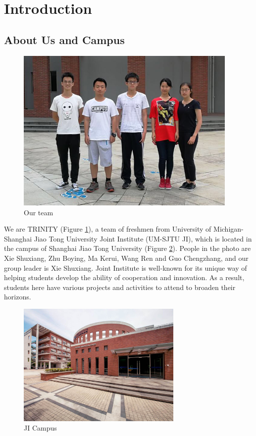 \section{Introduction}

\subsection{About Us and Campus}


\begin{figure}[H]
\centering
\includegraphics[height=8cm]{picture/teamMember}
  \caption{Our team \label{fig:teamMember}}
\end{figure}

We are TRINITY (Figure \ref{fig:teamMember}), a team of freshmen from University of
Michigan-Shanghai Jiao Tong University Joint Institute (UM-SJTU JI), which is
located in the campus of Shanghai Jiao Tong University (Figure
\ref{fig:campus}). People in the photo are Xie Shuxiang, Zhu Boying, Ma Kerui,
Wang Ren and Guo Chengzhang, and our group leader is Xie Shuxiang. Joint
Institute is well-known for its unique way of helping students develop the
ability of cooperation and innovation. As a result, students here have various
projects and activities to attend to broaden their horizons.  


\begin{figure}[H]
\centering
\includegraphics[width=8cm]{figure/campus}
  \caption{JI Campus \label{fig:campus}}
\end{figure}

